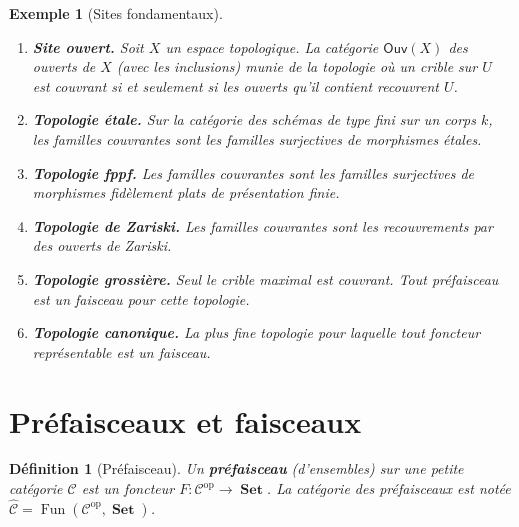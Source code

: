 \documentclass[a4paper,12pt]{book}
\DeclareMathOperator{\Fun}{Fun}
\DeclareMathOperator{\Set}{\mathbf{Set}}
\newcommand{\op}{\mathrm{op}}
\newtheorem{definition}[theoreme]{Définition}
\newtheorem{exemple}[theoreme]{Exemple}
\begin{document}
\begin{exemple}[Sites fondamentaux]\label{ex:sites}
\begin{enumerate}[label=(\roman*)]
\item \textbf{Site ouvert.}
      Soit $X$ un espace topologique.
      La catégorie $\mathsf{Ouv}(X)$ des ouverts de $X$
      (avec les inclusions) munie de la topologie où un crible
      sur $U$ est couvrant si et seulement si les ouverts qu'il
      contient recouvrent $U$.

\item \textbf{Topologie étale.}
      Sur la catégorie des schémas de type fini sur un corps $k$,
      les familles couvrantes sont les familles surjectives de
      morphismes étales.

\item \textbf{Topologie fppf.}
      Les familles couvrantes sont les familles surjectives de
      morphismes fidèlement plats de présentation finie.

\item \textbf{Topologie de Zariski.}
      Les familles couvrantes sont les recouvrements par des
      ouverts de Zariski.

\item \textbf{Topologie grossière.}
      Seul le crible maximal est couvrant.  Tout préfaisceau est
      un faisceau pour cette topologie.

\item \textbf{Topologie canonique.}
      La plus fine topologie pour laquelle tout foncteur
      représentable est un faisceau.
\end{enumerate}
\end{exemple}

\section{Préfaisceaux et faisceaux}\label{sec:faisceaux-site}

\begin{definition}[Préfaisceau]\label{def:prefaisceau-site}
Un \textbf{préfaisceau} (d'ensembles) sur une petite catégorie
$\mathcal{C}$ est un foncteur $F \colon \mathcal{C}^\op \to \Set$.
La catégorie des préfaisceaux est notée
$\widehat{\mathcal{C}} = \Fun(\mathcal{C}^\op, \Set)$.
\end{definition}
\end{document}
